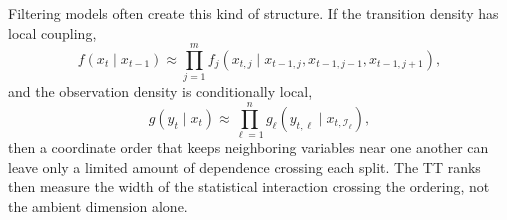 \documentclass[11pt]{article}
\numberwithin{equation}{section}
\begin{document}
Filtering models often create this kind of structure.  If the transition
density has local coupling,
\begin{equation}
    f(x_t\mid x_{t-1})
    \approx
    \prod_{j=1}^m f_j(x_{t,j}\mid x_{t-1,j},x_{t-1,j-1},x_{t-1,j+1}),
    \label{eq:p24-rank-local-transition}
\end{equation}
and the observation density is conditionally local,
\begin{equation}
    g(y_t\mid x_t)
    \approx
    \prod_{\ell=1}^n g_\ell(y_{t,\ell}\mid x_{t,\mathcal I_\ell}),
    \label{eq:p24-rank-local-observation}
\end{equation}
then a coordinate order that keeps neighboring variables near one another can
leave only a limited amount of dependence crossing each split.  The TT ranks
then measure the width of the statistical interaction crossing the ordering,
not the ambient dimension alone.
\end{document}
